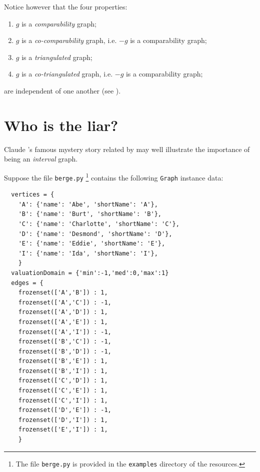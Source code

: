 Notice however that the four properties:
\begin{enumerate}[nosep]
\item $g$ is a \emph{comparability} graph;
\item $g$ is a \emph{co-comparability} graph, i.e. $-g$ is a comparability graph;
\item $g$ is a \emph{triangulated} graph;
\item $g$ is a \emph{co-triangulated} graph, i.e. $-g$ is a comparability graph;
\end{enumerate}
are independent of one another (see \citet[p. 275]{GOL-2004}).

\section{Who is the liar?}
\label{sec:23.2}

Claude \Berge's famous mystery story related by \citet[p. 20]{GOL-2004} may well illustrate the importance of being an \emph{interval} graph.

Suppose the file \texttt{berge.py} \footnote{The file \texttt{berge.py} is provided in the \texttt{examples} directory of the \Digraph resources.} contains the following \texttt{Graph} instance data:
\begin{lstlisting}
  vertices = {
    'A': {'name': 'Abe', 'shortName': 'A'},
    'B': {'name': 'Burt', 'shortName': 'B'},
    'C': {'name': 'Charlotte', 'shortName': 'C'},
    'D': {'name': 'Desmond', 'shortName': 'D'},
    'E': {'name': 'Eddie', 'shortName': 'E'},
    'I': {'name': 'Ida', 'shortName': 'I'},
    }
  valuationDomain = {'min':-1,'med':0,'max':1}
  edges = {
    frozenset(['A','B']) : 1, 
    frozenset(['A','C']) : -1, 
    frozenset(['A','D']) : 1, 
    frozenset(['A','E']) : 1, 
    frozenset(['A','I']) : -1, 
    frozenset(['B','C']) : -1, 
    frozenset(['B','D']) : -1, 
    frozenset(['B','E']) : 1, 
    frozenset(['B','I']) : 1, 
    frozenset(['C','D']) : 1, 
    frozenset(['C','E']) : 1, 
    frozenset(['C','I']) : 1, 
    frozenset(['D','E']) : -1, 
    frozenset(['D','I']) : 1, 
    frozenset(['E','I']) : 1, 
    }
\end{lstlisting}

